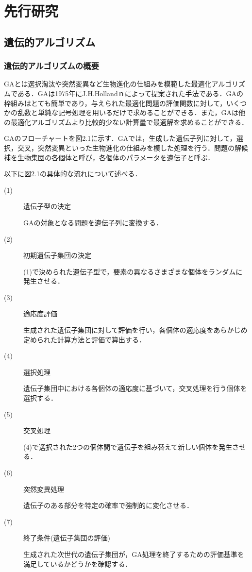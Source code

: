 \chapter{先行研究}
\thispagestyle{fancy} %
\lhead{}
\chead{}
\rhead{}
\lfoot{} 
\cfoot{\thepage}  
\rfoot{}
%

\section{遺伝的アルゴリズム}
\label{sec2.1}

\subsection{遺伝的アルゴリズムの概要}
\label{sec2.1.1}

GAとは選択淘汰や突然変異など生物進化の仕組みを模範した最適化アルゴリズムである．GAは1975年にJ.H.Hollandｎによって提案された手法である．GAの枠組みはとても簡単であり，与えられた最適化問題の評価関数に対して，いくつかの乱数と単純な記号処理を用いるだけで求めることができる．また，GAは他の最適化アルゴリズムより比較的少ない計算量で最適解を求めることができる．

GAのフローチャートを図2.1に示す．GAでは，生成した遺伝子列に対して，選択，交叉，突然変異といった生物進化の仕組みを模した処理を行う．問題の解候補を生物集団の各個体と呼び，各個体のパラメータを遺伝子と呼ぶ．

以下に図2.1の具体的な流れについて述べる．


\begin{description}
\item[ (1) ]遺伝子型の決定

GAの対象となる問題を遺伝子列に変換する．

\item[ (2) ]初期遺伝子集団の決定

(1)で決められた遺伝子型で，要素の異なるさまざまな個体をランダムに発生させる．

\item[ (3) ]適応度評価

生成された遺伝子集団に対して評価を行い，各個体の適応度をあらかじめ定められた計算方法と評価で算出する．

\item[ (4) ]選択処理

遺伝子集団中における各個体の適応度に基づいて，交叉処理を行う個体を選択する．

\item[ (5) ]交叉処理

(4)で選択された2つの個体間で遺伝子を組み替えて新しい個体を発生させる．

\item[ (6) ]突然変異処理

遺伝子のある部分を特定の確率で強制的に変化させる．

\item[ (7) ]終了条件(遺伝子集団の評価)

生成された次世代の遺伝子集団が，GA処理を終了するための評価基準を満足しているかどうかを確認する．
\end{description}

